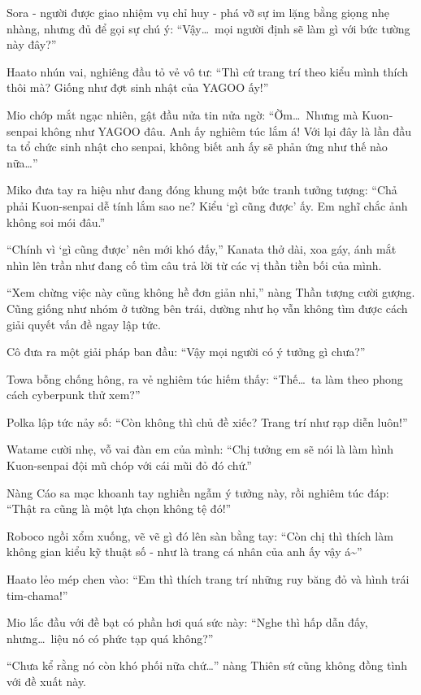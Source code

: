 \documentclass[../main.tex]{subfiles}
\begin{document}
Sora - người được giao nhiệm vụ chỉ huy - phá vỡ sự im lặng bằng giọng nhẹ nhàng, nhưng đủ để gọi sự chú ý: ``Vậy\dots\ mọi người định sẽ làm gì với bức tường này đây?''

Haato nhún vai, nghiêng đầu tỏ vẻ vô tư: ``Thì cứ trang trí theo kiểu mình thích thôi mà? Giống như đợt sinh nhật của YAGOO ấy!''

Mio chớp mắt ngạc nhiên, gật đầu nửa tin nửa ngờ: ``Ờm\dots\ Nhưng mà Kuon-senpai không như YAGOO đâu. Anh ấy nghiêm túc lắm á! Với lại đây là lần đầu ta tổ chức sinh nhật cho senpai, không biết anh ấy sẽ phản ứng như thế nào nữa\dots''

Miko đưa tay ra hiệu như đang đóng khung một bức tranh tưởng tượng: ``Chả phải Kuon-senpai dễ tính lắm sao ne? Kiểu `gì cũng được' ấy. Em nghĩ chắc ảnh không soi mói đâu.''

``Chính vì `gì cũng được' nên mới khó đấy,'' Kanata thở dài, xoa gáy, ánh mắt nhìn lên trần như đang cố tìm câu trả lời từ các vị thần tiền bối của mình.

``Xem chừng việc này cũng không hề đơn giản nhỉ,'' nàng Thần tượng cười gượng. Cũng giống như nhóm ở tường bên trái, dường như họ vẫn không tìm được cách giải quyết vấn đề ngay lập tức.

Cô đưa ra một giải pháp ban đầu: ``Vậy mọi người có ý tưởng gì chưa?''

Towa bỗng chống hông, ra vẻ nghiêm túc hiếm thấy: ``Thế\dots\ ta làm theo phong cách cyberpunk thử xem?''

Polka lập tức nảy số: ``Còn không thì chủ đề xiếc? Trang trí như rạp diễn luôn!''

Watame cười nhẹ, vỗ vai đàn em của mình: ``Chị tưởng em sẽ nói là làm hình Kuon-senpai đội mũ chóp với cái mũi đỏ đó chứ.''

Nàng Cáo sa mạc khoanh tay nghiền ngẫm ý tưởng này, rồi nghiêm túc đáp: ``Thật ra cũng là một lựa chọn không tệ đó!''

Roboco ngồi xổm xuống, vẽ vẽ gì đó lên sàn bằng tay: ``Còn chị thì thích làm không gian kiểu kỹ thuật số - như là trang cá nhân của anh ấy vậy á\~{}''

Haato lẻo mép chen vào: ``Em thì thích trang trí những ruy băng đỏ và hình trái tim-chama!''

Mio lắc đầu với đề bạt có phần hơi quá sức này: ``Nghe thì hấp dẫn đấy, nhưng\dots\ liệu nó có phức tạp quá không?''

``Chưa kể rằng nó còn khó phối nữa chứ\dots'' nàng Thiên sứ cũng không đồng tình với đề xuất này.
\end{document}
